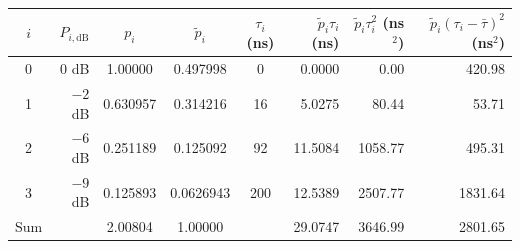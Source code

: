 \begin{tabular}{crcccrrr}
\toprule
$i$ & $P_{i,\mathrm{dB}}$ & $p_i$ & $\tilde p_i$ & $\tau_i$ (ns) & $\tilde p_i \tau_i$ (ns) & $\tilde p_i \tau_i^2$ (ns$^2$) & $\tilde p_i (\tau_i - \bar\tau)^2$ (ns$^2$) \\
\midrule
0 & $0$ dB & 1.00000 & 0.497998 & 0 & 0.0000 & 0.00 & 420.98 \\
1 & $-2$ dB & 0.630957 & 0.314216 & 16 & 5.0275 & 80.44 & 53.71 \\
2 & $-6$ dB & 0.251189 & 0.125092 & 92 & 11.5084 & 1058.77 & 495.31 \\
3 & $-9$ dB & 0.125893 & 0.0626943 & 200 & 12.5389 & 2507.77 & 1831.64 \\
\midrule
Sum & & 2.00804 & 1.00000 & & 29.0747 & 3646.99 & 2801.65 \\
\bottomrule
\end{tabular}
